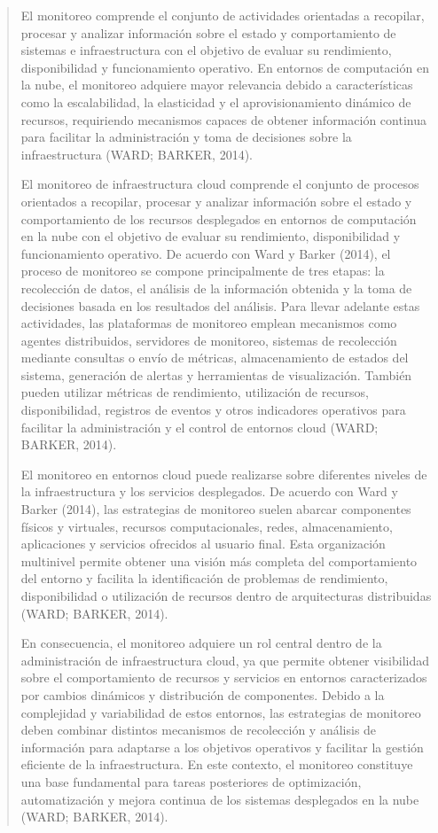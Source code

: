 \documentclass[
]{article}
\begin{document}
\begin{quote}
El monitoreo comprende el conjunto de actividades orientadas a
recopilar, procesar y analizar información sobre el estado y
comportamiento de sistemas e infraestructura con el objetivo de evaluar
su rendimiento, disponibilidad y funcionamiento operativo. En entornos
de computación en la nube, el monitoreo adquiere mayor relevancia debido
a características como la escalabilidad, la elasticidad y el
aprovisionamiento dinámico de recursos, requiriendo mecanismos capaces
de obtener información continua para facilitar la administración y toma
de decisiones sobre la infraestructura (WARD; BARKER, 2014).

El monitoreo de infraestructura cloud comprende el conjunto de procesos
orientados a recopilar, procesar y analizar información sobre el estado
y comportamiento de los recursos desplegados en entornos de computación
en la nube con el objetivo de evaluar su rendimiento, disponibilidad y
funcionamiento operativo. De acuerdo con Ward y Barker (2014), el
proceso de monitoreo se compone principalmente de tres etapas: la
recolección de datos, el análisis de la información obtenida y la toma
de decisiones basada en los resultados del análisis. Para llevar
adelante estas actividades, las plataformas de monitoreo emplean
mecanismos como agentes distribuidos, servidores de monitoreo, sistemas
de recolección mediante consultas o envío de métricas, almacenamiento de
estados del sistema, generación de alertas y herramientas de
visualización. También pueden utilizar métricas de rendimiento,
utilización de recursos, disponibilidad, registros de eventos y otros
indicadores operativos para facilitar la administración y el control de
entornos cloud (WARD; BARKER, 2014).

El monitoreo en entornos cloud puede realizarse sobre diferentes niveles
de la infraestructura y los servicios desplegados. De acuerdo con Ward y
Barker (2014), las estrategias de monitoreo suelen abarcar componentes
físicos y virtuales, recursos computacionales, redes, almacenamiento,
aplicaciones y servicios ofrecidos al usuario final. Esta organización
multinivel permite obtener una visión más completa del comportamiento
del entorno y facilita la identificación de problemas de rendimiento,
disponibilidad o utilización de recursos dentro de arquitecturas
distribuidas (WARD; BARKER, 2014).

En consecuencia, el monitoreo adquiere un rol central dentro de la
administración de infraestructura cloud, ya que permite obtener
visibilidad sobre el comportamiento de recursos y servicios en entornos
caracterizados por cambios dinámicos y distribución de componentes.
Debido a la complejidad y variabilidad de estos entornos, las
estrategias de monitoreo deben combinar distintos mecanismos de
recolección y análisis de información para adaptarse a los objetivos
operativos y facilitar la gestión eficiente de la infraestructura. En
este contexto, el monitoreo constituye una base fundamental para tareas
posteriores de optimización, automatización y mejora continua de los
sistemas desplegados en la nube (WARD; BARKER, 2014).
\end{quote}
\end{document}
